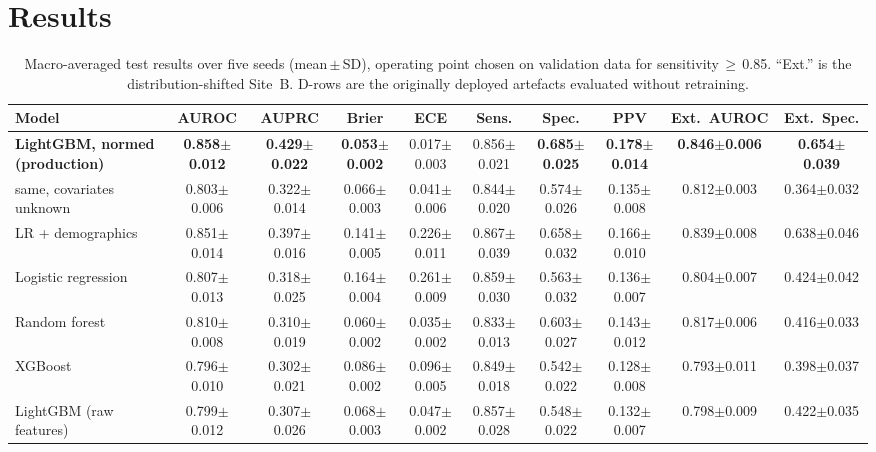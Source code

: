 \documentclass[conference]{IEEEtran}
\newcommand{\pmsd}[2]{#1{\scriptsize$\pm$#2}}
\begin{document}
\section{Results}\label{sec:results}
\begin{table}[!t]
\centering
\caption{Macro-averaged test results over five seeds (mean\,$\pm$\,SD), operating point chosen on validation data for sensitivity\,$\geq$\,0.85. ``Ext.'' is the distribution-shifted Site~B. D-rows are the originally deployed artefacts evaluated without retraining.}
\label{tab:main}
\setlength{\tabcolsep}{3.6pt}
\begin{tabular}{lccccccccc}
\toprule
Model & AUROC & AUPRC & Brier & ECE & Sens. & Spec. & PPV & Ext.\ AUROC & Ext.\ Spec. \\
\midrule
\textbf{LightGBM, normed (production)} & \textbf{\pmsd{0.858}{0.012}} & \textbf{\pmsd{0.429}{0.022}} & \textbf{\pmsd{0.053}{0.002}} & \pmsd{0.017}{0.003} & \pmsd{0.856}{0.021} & \textbf{\pmsd{0.685}{0.025}} & \textbf{\pmsd{0.178}{0.014}} & \textbf{\pmsd{0.846}{0.006}} & \textbf{\pmsd{0.654}{0.039}} \\
\quad same, covariates unknown & \pmsd{0.803}{0.006} & \pmsd{0.322}{0.014} & \pmsd{0.066}{0.003} & \pmsd{0.041}{0.006} & \pmsd{0.844}{0.020} & \pmsd{0.574}{0.026} & \pmsd{0.135}{0.008} & \pmsd{0.812}{0.003} & \pmsd{0.364}{0.032} \\
LR + demographics & \pmsd{0.851}{0.014} & \pmsd{0.397}{0.016} & \pmsd{0.141}{0.005} & \pmsd{0.226}{0.011} & \pmsd{0.867}{0.039} & \pmsd{0.658}{0.032} & \pmsd{0.166}{0.010} & \pmsd{0.839}{0.008} & \pmsd{0.638}{0.046} \\
Logistic regression & \pmsd{0.807}{0.013} & \pmsd{0.318}{0.025} & \pmsd{0.164}{0.004} & \pmsd{0.261}{0.009} & \pmsd{0.859}{0.030} & \pmsd{0.563}{0.032} & \pmsd{0.136}{0.007} & \pmsd{0.804}{0.007} & \pmsd{0.424}{0.042} \\
Random forest & \pmsd{0.810}{0.008} & \pmsd{0.310}{0.019} & \pmsd{0.060}{0.002} & \pmsd{0.035}{0.002} & \pmsd{0.833}{0.013} & \pmsd{0.603}{0.027} & \pmsd{0.143}{0.012} & \pmsd{0.817}{0.006} & \pmsd{0.416}{0.033} \\
XGBoost & \pmsd{0.796}{0.010} & \pmsd{0.302}{0.021} & \pmsd{0.086}{0.002} & \pmsd{0.096}{0.005} & \pmsd{0.849}{0.018} & \pmsd{0.542}{0.022} & \pmsd{0.128}{0.008} & \pmsd{0.793}{0.011} & \pmsd{0.398}{0.037} \\
LightGBM (raw features) & \pmsd{0.799}{0.012} & \pmsd{0.307}{0.026} & \pmsd{0.068}{0.003} & \pmsd{0.047}{0.002} & \pmsd{0.857}{0.028} & \pmsd{0.548}{0.022} & \pmsd{0.132}{0.007} & \pmsd{0.798}{0.009} & \pmsd{0.422}{0.035} \\

\end{tabular}
\end{table}
\end{document}
